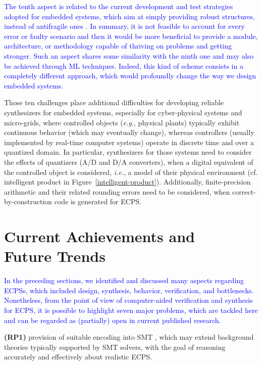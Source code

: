 \documentclass{cta-author}
\begin{document}
\textcolor{blue}{The tenth aspect is related to the current development and test strategies adopted for embedded systems, which aim at simply providing robust structures, instead of antifragile ones \cite{antifragile}. In summary, it is not feasible to account for every error or faulty scenario and then it would be more beneficial to provide a module, architecture, or methodology capable of thriving on problems and getting stronger. Such an aspect shares some similarity with the ninth one and may also be achieved through ML techniques. Indeed, this kind of scheme consists in a completely different approach, which would profoundly change the way we design embedded systems.}

Those ten challenges place additional difficulties for developing reliable synthesizers for embedded systems, especially for cyber-physical systems and micro-grids, where controlled objects ({\it e.g.}, physical plants) typically exhibit continuous behavior (which may eventually change), whereas controllers (usually implemented by real-time computer systems) operate in discrete time and over a quantized domain. In particular, synthesizers for those systems need to consider the effects of quantizers (A/D and D/A converters), when a digital equivalent of the controlled object is considered, {\it i.e.}, a model of their physical environment (cf. intelligent product in Figure~\ref{intelligent-product}). Additionally,  finite-precision arithmetic and their related rounding errors need to be considered, when correct-by-construction code is generated for ECPS.

\section{Current Achievements and \\ Future Trends}
\label{achievements}

\textcolor{blue}{In the preceding sections, we identified and discussed many aspects regarding ECPSs, which included design, synthesis, behavior, verification, and bottlenecks. Nonetheless, from the point of view of computer-aided verification and synthesis for ECPS, it is possible to highlight seven major problems, which are tackled here and can be regarded as (partially) open in current published research.}

\textbf{(RP1)} provision of suitable encoding into SMT \cite{BarrettSST09}, which may extend background theories typically supported by SMT solvers, with the goal of reasoning accurately and effectively about realistic ECPS.
\end{document}
